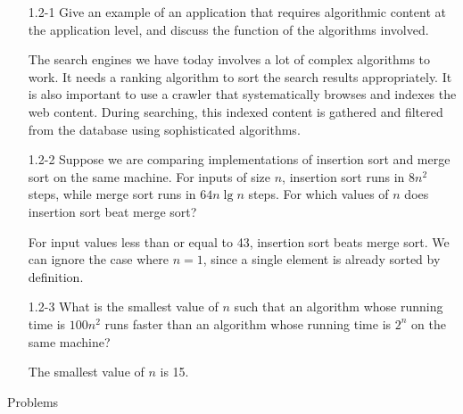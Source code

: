 \documentclass{report}
\makeatletter
\renewenvironment{framed}{%
 \def\FrameCommand##1{\hskip\@totalleftmargin
 \fboxsep=\FrameSep\fbox{##1}}%
 \MakeFramed {\advance\hsize-\width
   \@totalleftmargin\z@ \linewidth\hsize
   \@setminipage}}%
 {\par\unskip\endMakeFramed}
\makeatother
\begin{document}
\begin{enumerate}

\item[1.2{-}1] Give an example of an application that requires
  algorithmic content at the application level, and discuss the function of the
  algorithms involved.

\begin{framed}
The search engines we have today involves a lot of complex algorithms to work.
It needs a ranking algorithm to sort the search results appropriately. It is
also important to use a crawler that systematically browses and indexes the web
content. During searching, this indexed content is gathered and filtered from
the database using sophisticated algorithms.
\end{framed}

\item[1.2{-}2] Suppose we are comparing implementations of insertion
  sort and merge sort on the same machine. For inputs of size $n$, insertion sort
  runs in $8 n^2$ steps, while merge sort runs in $64 n \lg n$ steps. For which
  values of $n$ does insertion sort beat merge sort?

\begin{framed}
For input values less than or equal to 43, insertion sort beats merge sort. We
can ignore the case where $n = 1$, since a single element is already sorted by
definition.
\end{framed}

\item[1.2{-}3] What is the smallest value of $n$ such that an algorithm
  whose running time is $100 n^2$ runs faster than an algorithm whose running
  time is $2^n$ on the same machine?

\begin{framed}
The smallest value of $n$ is 15.
\end{framed}

\end{enumerate}

\pagebreak

{\large Problems}
\end{document}
